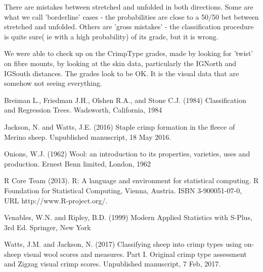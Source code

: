 \documentclass[titlepage]{article}  %
\begin{document}
There are mistakes between stretched and unfolded in both directions. Some are what we call 'borderline' cases - the probabilities are close to a 50/50 bet between stretched and unfolded. Others are 'gross mistakes' - the classification procedure is quite sure( ie with a high probability) of its grade, but it is wrong.

We were able to check up on  the CrimpType grades, made by looking for 'twist' on fibre mounts, by looking at the skin data, particularly the IGNorth and IGSouth distances. The grades look to be OK. It is the visual data that are somehow not seeing everything.
 

\begin{thebibliography}{99}

Breiman L., Friedman J.H., Olshen R.A., and Stone C.J. (1984)
Classification and Regression Trees. Wadsworth, California, 1984


Jackson, N. and Watts, J.E. (2016) Staple crimp formation in the fleece of Merino sheep. Unpublished manuscript, 18 May 2016.

Onions, W.J. (1962) Wool: an introduction to its properties, varieties, uses
     and production. Ernest Benn limited, London, 1962

R Core Team (2013). R: A language and environment for statistical
  computing. R Foundation for Statistical Computing, Vienna, Austria.
  ISBN 3-900051-07-0, URL http://www.R-project.org/.

Venables, W.N. and Ripley, B.D. (1999)
Modern Applied Statistics with S-Plus, 3rd Ed. Springer, New York

Watts, J.M. and Jackson, N. (2017) Classifying sheep into crimp types using on-sheep visual wool scores and measures. Part I. Original crimp type assessment and Zigzag visual crimp scores. Unpublished manuscript, 7 Feb, 2017.

\end{thebibliography}
\end{document}
